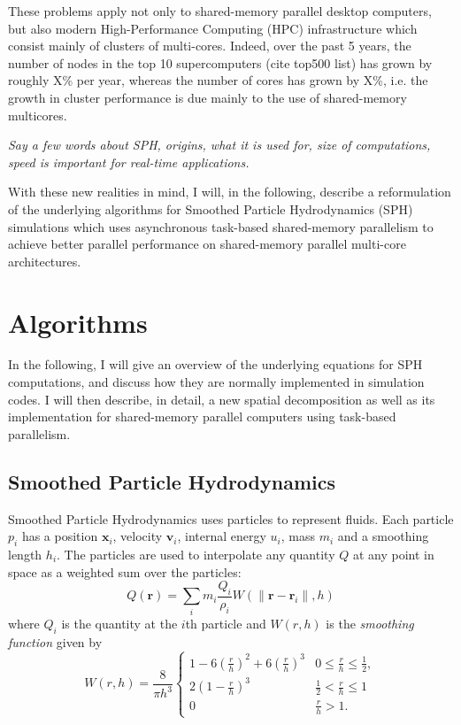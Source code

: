 \documentclass[final]{siamltex}
\begin{document}
These problems apply not only to shared-memory parallel desktop
computers, but also modern High-Performance Computing (HPC)
infrastructure which consist mainly of clusters of multi-cores.
Indeed, over the past 5 years, the number of nodes in the top 10
supercomputers (cite top500 list) has grown by roughly X\% per year,
whereas the number of cores has grown by X\%, i.e. the growth
in cluster performance is due mainly to the use of 
shared-memory multicores.

{\em Say a few words about SPH, origins, what it is used for,
size of computations, speed is important for real-time applications.}

With these new realities in mind, I will, in the following,
describe a reformulation of the
underlying algorithms for Smoothed Particle Hydrodynamics (SPH)
simulations which uses asynchronous
task-based shared-memory parallelism to achieve better parallel
performance on shared-memory parallel multi-core architectures.


\section{Algorithms}

In the following, I will give an overview of the underlying equations for
SPH computations, and discuss how they are normally implemented
in simulation codes.
I will then describe, in detail, a new spatial decomposition as well
as its implementation for shared-memory parallel computers using
task-based parallelism.

\subsection{Smoothed Particle Hydrodynamics}

Smoothed Particle Hydrodynamics uses particles to represent
fluids.
Each particle $p_i$ has a position $\mathbf x_i$,
velocity $\mathbf v_i$, internal energy $u_i$, mass $m_i$
and a smoothing length $h_i$.
The particles are used to interpolate any quantity $Q$ at any 
point in space as a weighted sum over the particles:
%
\begin{equation}
    Q(\mathbf r) = \sum_i m_i \frac{Q_i}{\rho_i} W( \|\mathbf r - \mathbf r_i\| , h )
    \label{eqn:interp}
\end{equation}
%
where $Q_i$ is the quantity at the $i$th particle and
$W(r,h)$ is the {\em smoothing function} given by
%
\begin{equation*}
    W(r,h) = \frac{8}{\pi h^3} \left\{
        \begin{array}{ll}
            1 - 6\left(\frac{r}{h}\right)^2 + 6\left(\frac{r}{h}\right)^3 & 0 \leq \frac{r}{h} \leq \frac{1}{2}, \\
            2\left( 1 - \frac{r}{h} \right)^3 & \frac{1}{2} < \frac{r}{h} \leq 1 \\
            0 & \frac{r}{h} > 1.
        \end{array}\right.
\end{equation*}
\end{document}
